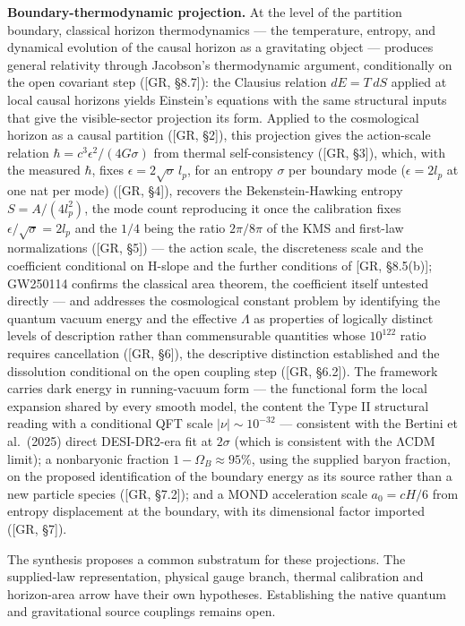 \documentclass[
]{article}
\begin{document}
\textbf{Boundary-thermodynamic projection.} At the level of the
partition boundary, classical horizon thermodynamics --- the
temperature, entropy, and dynamical evolution of the causal horizon as a
gravitating object --- produces general relativity through Jacobson's
thermodynamic argument, conditionally on the open covariant step ({[}GR,
§8.7{]}): the Clausius relation \(dE = T \, dS\) applied at local causal
horizons yields Einstein's equations with the same structural inputs
that give the visible-sector projection its form. Applied to the
cosmological horizon as a causal partition ({[}GR, §2{]}), this
projection gives the action-scale relation
\(\hbar = c^3 \epsilon^2 / (4G\sigma)\) from thermal self-consistency
({[}GR, §3{]}), which, with the measured \(\hbar\), fixes
\(\epsilon = 2\sqrt{\sigma}\, l_p\), for an entropy \(\sigma\) per
boundary mode (\(\epsilon = 2 l_p\) at one nat per mode) ({[}GR, §4{]}),
recovers the Bekenstein-Hawking entropy \(S = A/(4 l_p^2)\), the mode
count reproducing it once the calibration fixes
\(\epsilon/\sqrt{\sigma} = 2 l_p\) and the \(1/4\) being the ratio
\(2\pi/8\pi\) of the KMS and first-law normalizations ({[}GR, §5{]}) ---
the action scale, the discreteness scale and the coefficient conditional
on H-slope and the further conditions of {[}GR, §8.5(b){]}; GW250114
confirms the classical area theorem, the coefficient itself untested
directly --- and addresses the cosmological constant problem by
identifying the quantum vacuum energy and the effective \(\Lambda\) as
properties of logically distinct levels of description rather than
commensurable quantities whose \(10^{122}\) ratio requires cancellation
({[}GR, §6{]}), the descriptive distinction established and the
dissolution conditional on the open coupling step ({[}GR, §6.2{]}). The
framework carries dark energy in running-vacuum form --- the functional
form the local expansion shared by every smooth model, the content the
Type II structural reading with a conditional QFT scale
\(\lvert\nu\rvert\sim 10^{-32}\) --- consistent with the Bertini et
al.~(2025) direct DESI-DR2-era fit at \(2\sigma\) (which is consistent
with the ΛCDM limit); a nonbaryonic fraction \(1-\Omega_B\approx95\%\),
using the supplied baryon fraction, on the proposed identification of
the boundary energy as its source rather than a new particle species
({[}GR, §7.2{]}); and a MOND acceleration scale \(a_0 = cH/6\) from
entropy displacement at the boundary, with its dimensional factor
imported ({[}GR, §7{]}).

The synthesis proposes a common substratum for these projections. The
supplied-law representation, physical gauge branch, thermal calibration
and horizon-area arrow have their own hypotheses. Establishing the
native quantum and gravitational source couplings remains open.
\end{document}
